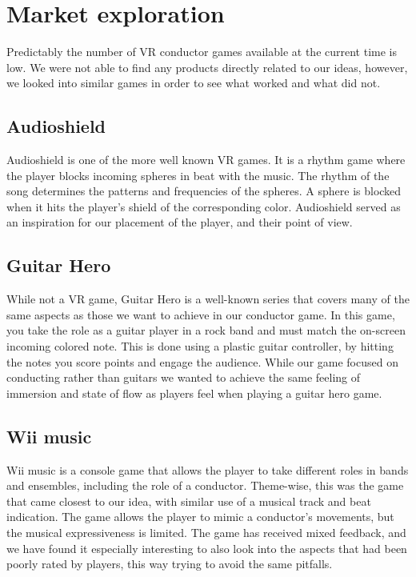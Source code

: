 \section{Market exploration}
Predictably the number of VR conductor games available at the current time is low. We were not able to find any products directly related to our ideas, however, we looked into similar games in order to see what worked and what did not.  

\subsection{Audioshield}
Audioshield is one of the more well known VR games. It is a rhythm game where the player blocks incoming spheres in beat with the music. The rhythm of the song determines the patterns and frequencies of the spheres. A sphere is blocked when it hits the player’s shield of the corresponding color. Audioshield served as an inspiration for our placement of the player, and their point of view.

\subsection{Guitar Hero}
While not a VR game, Guitar Hero is a well-known series that covers many of the same aspects as those we want to achieve in our conductor game. In this game, you take the role as a guitar player in a rock band and must match the on-screen incoming colored note. This is done using a plastic guitar controller, by hitting the notes you score points and engage the audience. While our game focused on conducting rather than guitars we wanted to achieve the same feeling of immersion and state of flow as players feel when playing a guitar hero game.

\subsection{Wii music}
Wii music is a console game that allows the player to take different roles in bands and ensembles, including the role of a conductor. Theme-wise, this was the game that came closest to our idea, with similar use of a musical track and beat indication. The game allows the player to mimic a conductor’s movements, but the musical expressiveness is limited. The game has received mixed feedback, and we have found it especially interesting to also look into the aspects that had been poorly rated by players, this way trying to avoid the same pitfalls.